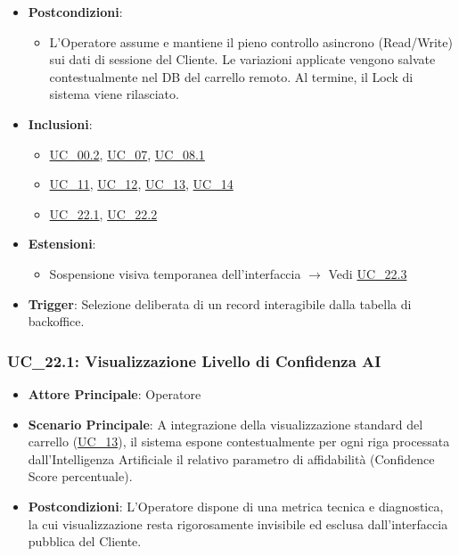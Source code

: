 \begin{itemize}
\begin{itemize}
    \end{itemize}
    \item \textbf{Postcondizioni}:
    \begin{itemize}
        \item L'Operatore assume e mantiene il pieno controllo asincrono (Read/Write) sui dati di sessione del Cliente. Le variazioni applicate vengono salvate contestualmente nel DB del carrello remoto. Al termine, il Lock di sistema viene rilasciato.
    \end{itemize}
    \item \textbf{Inclusioni}:
    \begin{itemize}
        \item \hyperref[uc_00.2]{UC\_00.2}, \hyperref[uc_07]{UC\_07}, \hyperref[uc_08.1]{UC\_08.1}
        \item \hyperref[uc_11]{UC\_11}, \hyperref[uc_12]{UC\_12}, \hyperref[uc_13]{UC\_13}, \hyperref[uc_14]{UC\_14}
        \item \hyperref[uc_22.1]{UC\_22.1}, \hyperref[uc_22.2]{UC\_22.2}
    \end{itemize}
    \item \textbf{Estensioni}:
    \begin{itemize}
        \item Sospensione visiva temporanea dell'interfaccia $\rightarrow$ Vedi \hyperref[uc_22.3]{UC\_22.3}
    \end{itemize}
    \item \textbf{Trigger}: Selezione deliberata di un record interagibile dalla tabella di backoffice.
\end{itemize}

\subsubsection{UC\_22.1: Visualizzazione Livello di Confidenza AI}
\label{uc_22.1}
\begin{itemize}
    \item \textbf{Attore Principale}: Operatore
    \item \textbf{Scenario Principale}: A integrazione della visualizzazione standard del carrello (\hyperref[uc_13]{UC\_13}), il sistema espone contestualmente per ogni riga processata dall'Intelligenza Artificiale il relativo parametro di affidabilità (Confidence Score percentuale).
    \item \textbf{Postcondizioni}: L'Operatore dispone di una metrica tecnica e diagnostica, la cui visualizzazione resta rigorosamente invisibile ed esclusa dall'interfaccia pubblica del Cliente.
\end{itemize}

